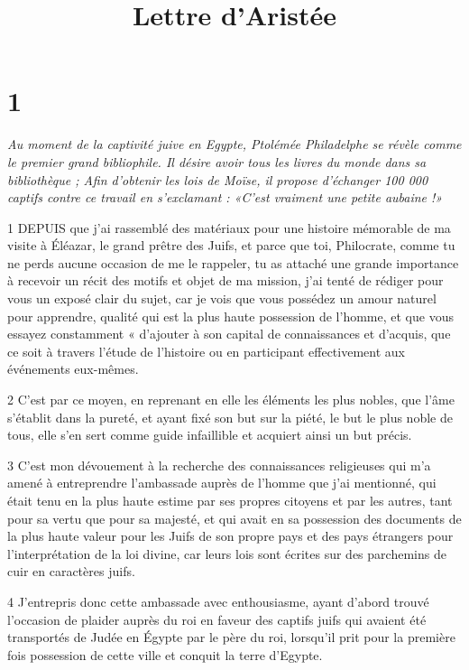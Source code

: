 

\title{Lettre d'Aristée}

\chapter{1}

\par \textit{Au moment de la captivité juive en Egypte, Ptolémée Philadelphe se révèle comme le premier grand bibliophile. Il désire avoir tous les livres du monde dans sa bibliothèque ; Afin d'obtenir les lois de Moïse, il propose d'échanger 100 000 captifs contre ce travail en s'exclamant : «C'est vraiment une petite aubaine !»}

\par 1 DEPUIS que j'ai rassemblé des matériaux pour une histoire mémorable de ma visite à Éléazar, le grand prêtre des Juifs, et parce que toi, Philocrate, comme tu ne perds aucune occasion de me le rappeler, tu as attaché une grande importance à recevoir un récit des motifs et objet de ma mission, j'ai tenté de rédiger pour vous un exposé clair du sujet, car je vois que vous possédez un amour naturel pour apprendre, qualité qui est la plus haute possession de l'homme, et que vous essayez constamment « d'ajouter à son capital de connaissances et d'acquis, que ce soit à travers l'étude de l'histoire ou en participant effectivement aux événements eux-mêmes.

\par 2 C'est par ce moyen, en reprenant en elle les éléments les plus nobles, que l'âme s'établit dans la pureté, et ayant fixé son but sur la piété, le but le plus noble de tous, elle s'en sert comme guide infaillible et acquiert ainsi un but précis.

\par 3 C'est mon dévouement à la recherche des connaissances religieuses qui m'a amené à entreprendre l'ambassade auprès de l'homme que j'ai mentionné, qui était tenu en la plus haute estime par ses propres citoyens et par les autres, tant pour sa vertu que pour sa majesté, et qui avait en sa possession des documents de la plus haute valeur pour les Juifs de son propre pays et des pays étrangers pour l'interprétation de la loi divine, car leurs lois sont écrites sur des parchemins de cuir en caractères juifs.

\par 4 J'entrepris donc cette ambassade avec enthousiasme, ayant d'abord trouvé l'occasion de plaider auprès du roi en faveur des captifs juifs qui avaient été transportés de Judée en Égypte par le père du roi, lorsqu'il prit pour la première fois possession de cette ville et conquit la terre d'Egypte.

